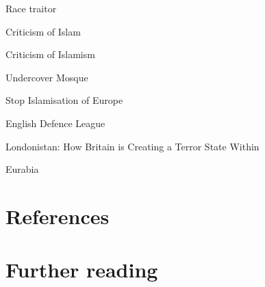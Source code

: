 Race traitor

Criticism of Islam

Criticism of Islamism

Undercover Mosque

Stop Islamisation of Europe

English Defence League

Londonistan: How Britain is Creating a Terror State Within

Eurabia

\section{References}\label{references}

\section{Further reading}\label{further-reading}
